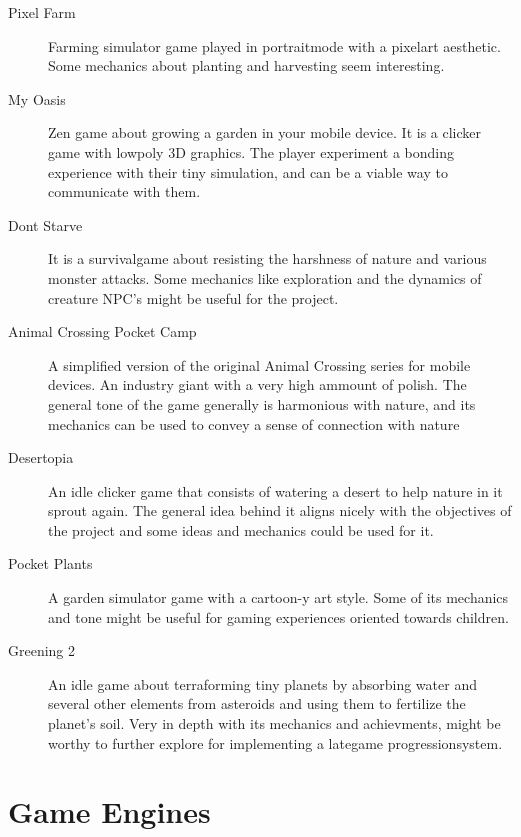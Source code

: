 \begin{description}

\item[Pixel Farm]{Farming simulator game played in \gls{portraitmode} with a \gls{pixelart}
aesthetic. Some mechanics about planting and harvesting seem interesting.}
\item[My Oasis]{Zen game about growing a garden in your mobile device. It is a \gls{clicker} game with \gls{lowpoly} 3D graphics. The player experiment a bonding experience with their tiny simulation, and can be a viable way to communicate with them.}

\item[Dont Starve]{It is a \gls{survivalgame} about resisting the harshness of nature and various monster attacks. Some mechanics like exploration and the dynamics of creature \gls{NPC}'s might be useful for the project.}

\item[Animal Crossing Pocket Camp]{A simplified version of the original Animal Crossing series for mobile devices. An industry giant with a very high ammount of polish. The general tone of the game generally is harmonious with nature, and its mechanics can be used to convey a sense of connection with nature}

\item[Desertopia]{An \gls{idle} \gls{clicker} game that consists of watering a desert to help nature in it sprout again. The general idea behind it aligns nicely with the objectives of the project and some ideas and mechanics could be used for it.}

\item[Pocket Plants]{A garden simulator game with a cartoon-y art style. Some of its mechanics and tone might be useful for gaming experiences oriented towards children.}

\item[Greening 2]{An \gls{idle} game about terraforming tiny planets by absorbing water and several other elements from asteroids and using them to fertilize the planet's soil. Very in depth with its mechanics and achievments, might be worthy to further explore for implementing a \gls{lategame} \gls{progressionsystem}.}

\end{description}

\section{Game Engines}

